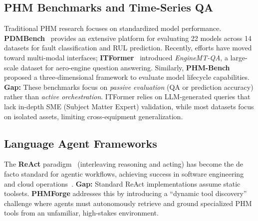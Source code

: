 \documentclass[sigconf, screen, nonacm]{acmart}
\begin{document}
\subsection{PHM Benchmarks and Time-Series QA}
Traditional PHM research focuses on standardized model performance. \textbf{PDMBench}~\cite{anonymous2026pdmbench} provides an extensive platform for evaluating 22 models across 14 datasets for fault classification and RUL prediction. Recently, efforts have moved toward multi-modal interfaces; \textbf{ITFormer}~\cite{wang2025itformer} introduced \textit{EngineMT-QA}, a large-scale dataset for aero-engine question answering. Similarly, \textbf{PHM-Bench}~\cite{yang2025phmbenchdomainspecificbenchmarkingframework} proposed a three-dimensional framework to evaluate model lifecycle capabilities.
\textbf{Gap:} These benchmarks focus on \textit{passive evaluation} (QA or prediction accuracy) rather than \textit{active orchestration}. ITFormer relies on LLM-generated queries that lack in-depth SME (Subject Matter Expert) validation, while most datasets focus on isolated assets, limiting cross-equipment generalization.

\subsection{Language Agent Frameworks}
The \textbf{ReAct} paradigm~\cite{yao2023reactsynergizingreasoningacting} (interleaving reasoning and acting) has become the de facto standard for agentic workflows, achieving success in software engineering~\cite{yang2024sweagentagentcomputerinterfacesenable} and cloud operations~\cite{shetty2024buildingaiagentsautonomous}. 
\textbf{Gap:} Standard ReAct implementations assume static toolsets. \textbf{PHMForge} addresses this by introducing a ``dynamic tool discovery'' challenge where agents must autonomously retrieve and ground specialized PHM tools from an unfamiliar, high-stakes environment.
\end{document}
